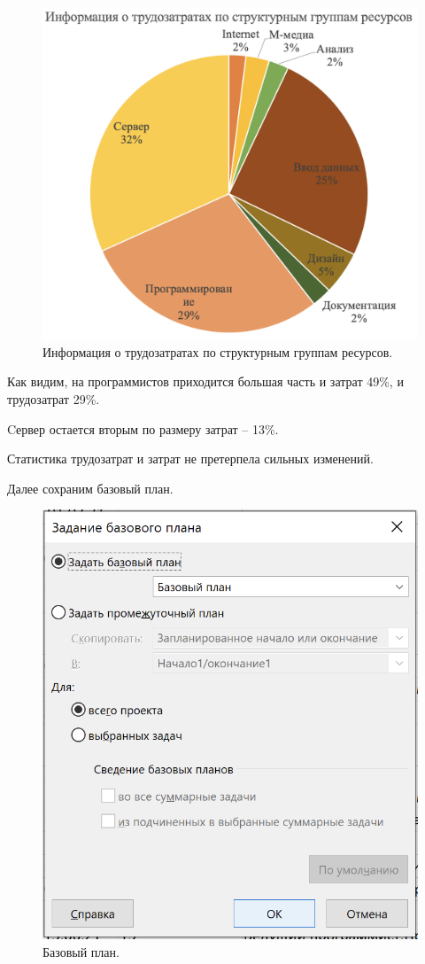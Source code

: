 \documentclass[a4paper,14pt]{extreport} %
\begin{document}
\begin{enumerate}
\begin{figure}[H]
  \centering
  \caption{Информация о трудозатратах по структурным группам ресурсов. }
  \includegraphics[scale=0.75]{d2}
\end{figure}

Как видим, на программистов приходится большая часть и затрат 49\%, и трудозатрат 29\%.

Cервер остается вторым по размеру затрат -- 13\%.

Статистика трудозатрат и затрат не претерпела сильных изменений.

Далее сохраним базовый план.

\begin{figure}[H]
  \centering
  \caption{Базовый план. }
  \includegraphics[scale=0.75]{13}
\end{figure}



\end{enumerate}
\end{document}
